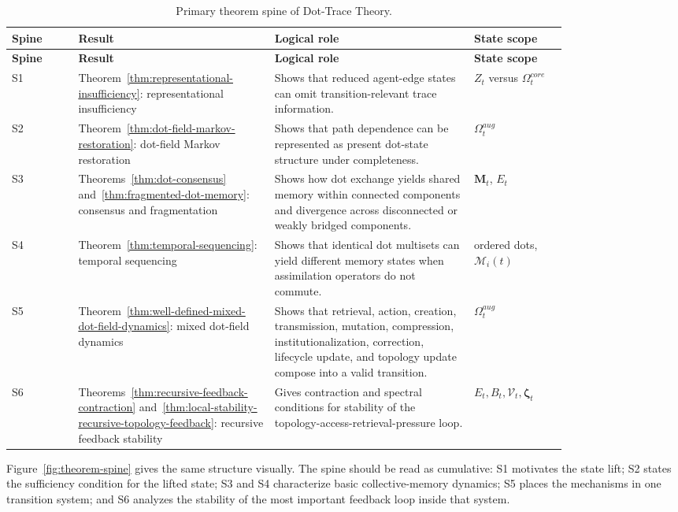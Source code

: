 \documentclass[11pt]{article}
\theoremstyle{remark}
\begin{document}
{\small
\begin{longtable}{L{0.10\linewidth}L{0.28\linewidth}L{0.30\linewidth}L{0.14\linewidth}}
\caption{Primary theorem spine of Dot-Trace Theory.}\label{tab:primary-theorem-spine}\\
\toprule
\textbf{Spine} & \textbf{Result} & \textbf{Logical role} & \textbf{State scope}\\
\midrule
\endfirsthead
\toprule
\textbf{Spine} & \textbf{Result} & \textbf{Logical role} & \textbf{State scope}\\
\midrule
\endhead
S1 & Theorem~\ref{thm:representational-insufficiency}: representational insufficiency & Shows that reduced agent-edge states can omit transition-relevant trace information. & $Z_t$ versus $\Omega_t^{core}$\\
S2 & Theorem~\ref{thm:dot-field-markov-restoration}: dot-field Markov restoration & Shows that path dependence can be represented as present dot-state structure under completeness. & $\Omega_t^{aug}$\\
S3 & Theorems~\ref{thm:dot-consensus} and~\ref{thm:fragmented-dot-memory}: consensus and fragmentation & Shows how dot exchange yields shared memory within connected components and divergence across disconnected or weakly bridged components. & $\mathbf M_t$, $E_t$\\
S4 & Theorem~\ref{thm:temporal-sequencing}: temporal sequencing & Shows that identical dot multisets can yield different memory states when assimilation operators do not commute. & ordered dots, $\mathcal M_i(t)$\\
S5 & Theorem~\ref{thm:well-defined-mixed-dot-field-dynamics}: mixed dot-field dynamics & Shows that retrieval, action, creation, transmission, mutation, compression, institutionalization, correction, lifecycle update, and topology update compose into a valid transition. & $\Omega_t^{aug}$\\
S6 & Theorems~\ref{thm:recursive-feedback-contraction} and~\ref{thm:local-stability-recursive-topology-feedback}: recursive feedback stability & Gives contraction and spectral conditions for stability of the topology-access-retrieval-pressure loop. & $E_t,B_t,\mathcal V_t,\boldsymbol{\zeta}_t$\\
\bottomrule
\end{longtable}
}

Figure~\ref{fig:theorem-spine} gives the same structure visually. The spine should be read as cumulative: S1 motivates the state lift; S2 states the sufficiency condition for the lifted state; S3 and S4 characterize basic collective-memory dynamics; S5 places the mechanisms in one transition system; and S6 analyzes the stability of the most important feedback loop inside that system.
\end{document}
